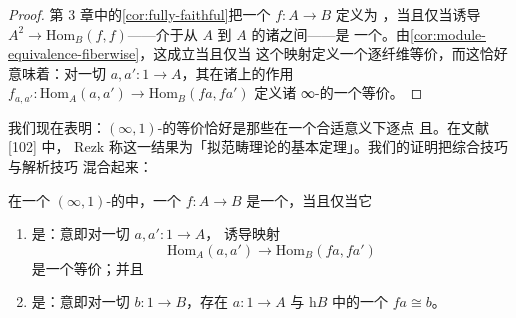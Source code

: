 \begin{proof}
第 3 章中的\cref{cor:fully-faithful}把一个\trFunctor{} $f\colon A\to B$ 定义为%
\trFullyFaithful，当且仅当诱导\trFunctor{}
$A^{2}\to\mathrm{Hom}_{B}(f,f)$——介于从 $A$ 到 $A$ 的诸\trModule{}之间——是
一个\trEquivalence。由\cref{cor:module-equivalence-fiberwise}，这成立当且仅当
这个映射定义一个逐纤维等价，而这恰好意味着：对一切\trElement{}
$a,a'\colon 1\to A$，其在诸\trMappingSpace{}上的作用
$f_{a,a'}\colon\mathrm{Hom}_{A}(a,a')\to\mathrm{Hom}_{B}(fa,fa')$ 定义诸%
\trDiscrete{}∞-\trCategory{}的一个等价。
\end{proof}

我们现在表明：$(\infty,1)$-\trCategory{}的等价恰好是那些在一个合适意义下逐点%
\trFullyFaithful{}且\trEssentiallySurjective\trFunctor。在文献 [102] 中，
Rezk 称这一结果为「拟范畴理论的基本定理」。我们的证明把综合技巧与解析技巧
混合起来：

\begin{theorem}\label{thm:fundamental-theorem}
在一个 $(\infty,1)$-\trCategory{}的\trInfinityCosmos{}中，一个\trFunctor{}
$f\colon A\to B$ 是一个\trEquivalence，当且仅当它
\begin{enumerate}[label=(\roman*)]
\item 是\textbf{\trFullyFaithful}：意即对一切\trElement{} $a,a'\colon 1\to A$，
  诱导映射
\[
\mathrm{Hom}_{A}(a,a')\longrightarrow\mathrm{Hom}_{B}(fa,fa')
\]
  是一个等价；并且
\item 是\textbf{\trEssentiallySurjective}：意即对一切 $b\colon 1\to B$，存在
  $a\colon 1\to A$ 与\trHomotopyCategory{} $\mathrm{h}B$ 中的一个%
\trIsomorphism{} $fa\cong b$。
\end{enumerate}
\end{theorem}

